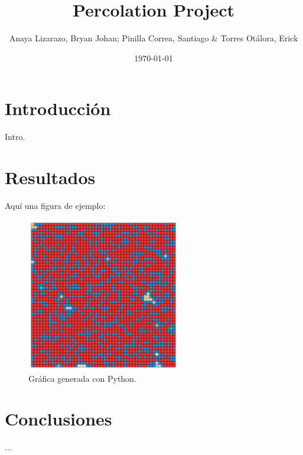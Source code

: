 \documentclass{article}
\title{Percolation Project}
\author{Anaya Lizarazo, Bryan Johan; Pinilla Correa, Santiago \& Torres Otálora, Erick}
\date{\today}
\begin{document}
 

\maketitle

\section{Introducción}
Intro.

\section{Resultados}
Aquí una figura de ejemplo:

\begin{figure}[h]
    \centering
    \includegraphics[width=0.6\textwidth]{clusters.pdf}
    \caption{Gráfica generada con Python.}
\end{figure}



\section{Conclusiones}
...
\end{document}
